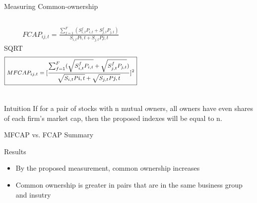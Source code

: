 \documentclass{beamer}
\begin{document}
	\begin{frame}{Measuring Common-ownership}\label{Intuition}
				\begin{columns}
			\centering  
						\cite{AntonPolk}
								\begin{align*}
									\boxed{FCAP_{ij,t} = \frac{\sum_{f = 1}^{F} (S^f_{i,t}P_{i,t}+S^f_{j,t}P_{j,t})}{S_{i,t}P{i,t} + S_{j,t}P{j,t}}}
								\end{align*} 
			\centering
			SQRT
						\begin{align*}
						\footnotesize	\boxed{    MFCAP_{ij,t} =           [\frac{\sum_{f =1}^{F}(\sqrt{S^f_{i,t}P_{i,t}}+\sqrt{S^f_{j,t}P_{j,t}})}{\sqrt{S_{i,t}P{i,t}} + \sqrt{S_{j,t}P{j,t}}}]^2 }
						\end{align*}     				         
		\end{columns}
	\pause
		\begin{block}{Intuition}
			If for a pair of stocks with n mutual owners, all owners have even shares of each firm's market cap, then the proposed indexes will be equal to n.
			\hyperlink{Proof}{}
		\end{block}
		
	\end{frame}
	
	
				\begin{frame}{MFCAP vs. FCAP Summary}
					\begin{table}[htbp]
						\centering
						\resizebox{\textwidth}{!}
						{
							  }          
					\end{table}%
					\begin{block}{Results}
						\small
						\begin{itemize}
							\item By the proposed measurement, common ownership increases
							\item Common ownership is greater in pairs that  are in the same business group and insutry
						\end{itemize}
					\end{block}
				\end{frame}
		
\end{document}
